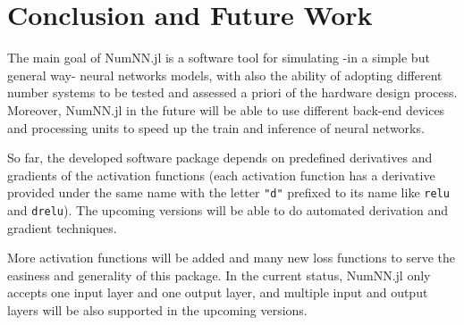 \section{Conclusion and Future Work}

The main goal of NumNN.jl is a software tool for simulating -in a simple but general way- neural networks models, with also the ability of adopting different number systems to be tested and assessed a priori of the hardware design process. Moreover, NumNN.jl in the future will be able to use different back-end devices and processing units to speed up the train and inference of neural networks. 

So far, the developed software package depends on predefined derivatives and gradients of the activation functions (each activation function has a derivative provided under the same name with the letter \texttt{"d"} prefixed to its name like \texttt{relu} and \texttt{drelu}). The upcoming versions will be able to do automated derivation and gradient techniques.

More activation functions will be added and many new loss functions to serve the easiness and generality of this package. In the current status, NumNN.jl only accepts one input layer and one output layer, and multiple input and output layers will be also supported in the upcoming versions.